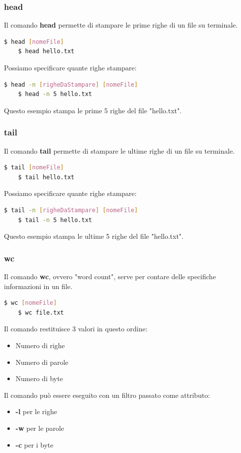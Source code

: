 \documentclass[12pt,a4paper]{article}
\begin{document}
\subsubsection{head}
Il comando \textbf{head} permette di stampare le prime righe di un file su terminale.
\begin{lstlisting}[language=bash]
    $ head [nomeFile]
    $ head hello.txt
\end{lstlisting}
Possiamo specificare quante righe stampare:
\begin{lstlisting}[language=bash]
    $ head -n [righeDaStampare] [nomeFile]
    $ head -n 5 hello.txt
\end{lstlisting}
Questo esempio stampa le prime 5 righe del file "hello.txt".
\subsubsection{tail}
Il comando \textbf{tail} permette di stampare le ultime righe di un file su terminale.
\begin{lstlisting}[language=bash]
    $ tail [nomeFile]
    $ tail hello.txt
\end{lstlisting}
Possiamo specificare quante righe stampare:
\begin{lstlisting}[language=bash]
    $ tail -n [righeDaStampare] [nomeFile]
    $ tail -n 5 hello.txt
\end{lstlisting}
Questo esempio stampa le ultime 5 righe del file "hello.txt".
\subsubsection{wc}
Il comando \textbf{wc}, ovvero "word count", serve per contare delle specifiche informazioni in un file.
\begin{lstlisting}[language=bash]
    $ wc [nomeFile]
    $ wc file.txt
\end{lstlisting}
Il comando restituisce 3 valori in questo ordine:
\begin{itemize}
    \item Numero di righe
    \item Numero di parole
    \item Numero di byte
\end{itemize}
Il comando può essere eseguito con un filtro passato come attributo:
\begin{itemize}
    \item \textbf{-l} per le righe
    \item \textbf{-w} per le parole
    \item \textbf{-c} per i byte
\end{itemize}
\end{document}
